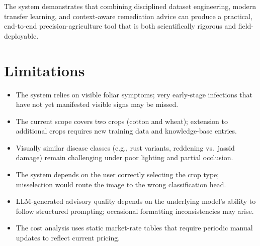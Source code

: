 \documentclass[12pt,a4paper]{report}
\begin{document}
The system demonstrates that combining disciplined dataset engineering, modern transfer learning, and context-aware remediation advice can produce a practical, end-to-end precision-agriculture tool that is both scientifically rigorous and field-deployable.

\section{Limitations}
\begin{itemize}
    \item The system relies on visible foliar symptoms; very early-stage infections that have not yet manifested visible signs may be missed.
    \item The current scope covers two crops (cotton and wheat); extension to additional crops requires new training data and knowledge-base entries.
    \item Visually similar disease classes (e.g., rust variants, reddening vs.\ jassid damage) remain challenging under poor lighting and partial occlusion.
    \item The system depends on the user correctly selecting the crop type; misselection would route the image to the wrong classification head.
    \item LLM-generated advisory quality depends on the underlying model's ability to follow structured prompting; occasional formatting inconsistencies may arise.
    \item The cost analysis uses static market-rate tables that require periodic manual updates to reflect current pricing.
\end{itemize}
\end{document}
